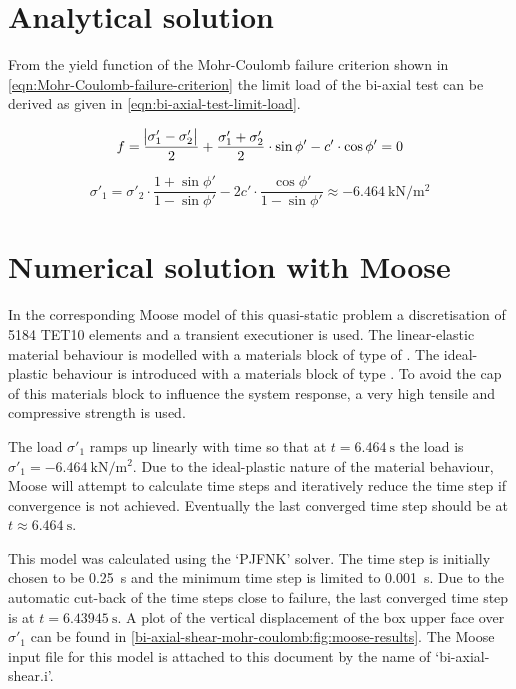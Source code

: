\section{Analytical solution}
\label{bi-axial-shear-mohr-coulomb:sec:analytical-solution}

From the yield function of the Mohr-Coulomb failure criterion shown in
\autoref{eqn:Mohr-Coulomb-failure-criterion} the limit load of the bi-axial
test can be derived as given in \autoref{eqn:bi-axial-test-limit-load}.

\begin{equation}
    \label{eqn:Mohr-Coulomb-failure-criterion}
    f = \frac{\abs{\sigma'_1 - \sigma'_2}}{2} + \frac{\sigma'_1 + \sigma'_2}{2} \cdot \sin{\phi'} - c' \cdot \cos{\phi'} = 0
\end{equation}

\begin{equation}
    \label{eqn:bi-axial-test-limit-load}
    \sigma'_1 = \sigma'_2 \cdot \frac{1 + \sin{\phi'}}{1 - \sin{\phi'}} - 2c' \cdot \frac{\cos{\phi'}}{1 - \sin{\phi'}}
    \approx \qty{-6.464}{\kilo\newton\per\square\metre}
\end{equation}

\section{Numerical solution with Moose}
\label{bi-axial-shear-mohr-coulomb:sec:moose}

In the corresponding Moose model of this quasi-static problem a discretisation
of \qty{5184}{} TET10 elements and a transient executioner is used. The
linear-elastic material behaviour is modelled with a materials block of type of
. The ideal-plastic behaviour is
introduced with a materials block of type
. To avoid the cap of this materials
block to influence the system response, a very high tensile and compressive
strength is used.

The load $\sigma'_1$ ramps up linearly with time so that at $t =
    \qty{6.464}{\second}$ the load is $\sigma'_1 =
    \qty{-6.464}{\kilo\newton\per\square\metre}$. Due to the ideal-plastic nature
of the material behaviour, Moose will attempt to calculate time steps and
iteratively reduce the time step if convergence is not achieved. Eventually the
last converged time step should be at $t \approx \qty{6.464}{\second}$.

This model was calculated using the ‘PJFNK’ solver. The time step is initially
chosen to be \qty{0.25}{\second} and the minimum time step is limited to
\qty{0.001}{\second}. Due to the automatic cut-back of the time steps close to
failure, the last converged time step is at $t=\qty{6.43945}{\second}$. A plot
of the vertical displacement of the box upper face over $\sigma'_1$ can be
found in \autoref{bi-axial-shear-mohr-coulomb:fig:moose-results}. The Moose
input file for this model is attached to this document by the name of
‘bi-axial-shear.i’.

